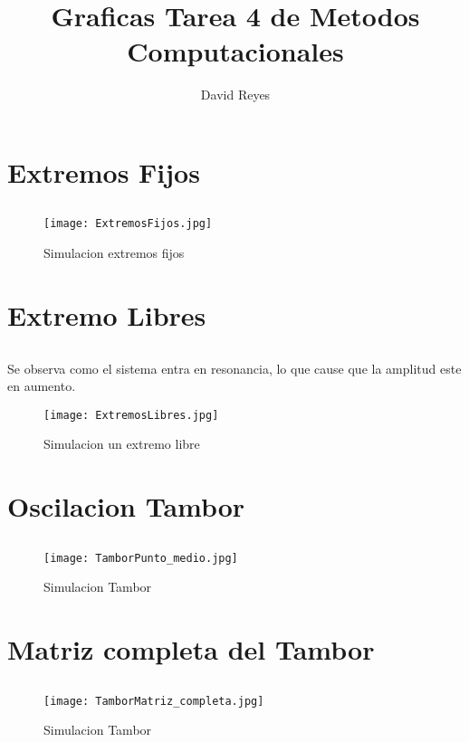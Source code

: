 \documentclass[12pt]{article}
\author{David Reyes}
\title{Graficas Tarea 4 de Metodos Computacionales}
\begin{document}
\maketitle
\section{Extremos Fijos}
\subsection{}
\begin{figure}[htb]
\centering
\texttt{[image: ExtremosFijos.jpg]}
\caption{Simulacion extremos fijos}
\label{fig_ref_cycle}
\end{figure}


\section{Extremo Libres}
\subsection{}
Se observa como el sistema entra en resonancia, lo que cause que la amplitud este en aumento.
\begin{figure}[htb]
\centering
\texttt{[image: ExtremosLibres.jpg]}
\caption{Simulacion un extremo libre}
\label{fig_ref_cycle}
\end{figure}



\section{Oscilacion Tambor}
\subsection{}
\begin{figure}[htb]
\centering
\texttt{[image: TamborPunto\_medio.jpg]}
\caption{Simulacion Tambor}
\label{fig_ref_cycle}
\end{figure}



\section{Matriz completa del Tambor}
\subsection{}
\begin{figure}[htb]
\centering
\texttt{[image: TamborMatriz\_completa.jpg]}
\caption{Simulacion Tambor}
\label{fig_ref_cycle}
\end{figure}
\end{document}
